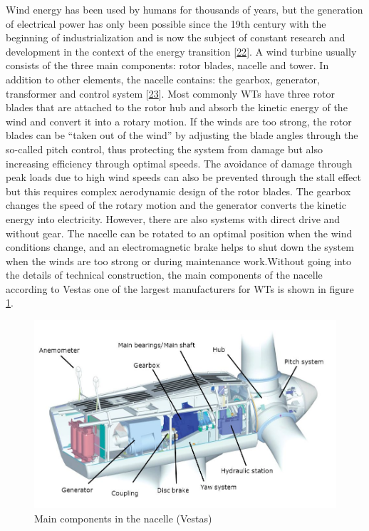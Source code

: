 \documentclass[a4paper,11pt]{article}
\begin{document}
Wind energy has been used by humans for thousands of years, but the generation of electrical power has only been possible since the 19th century with the beginning of industrialization and is now the subject of constant research and development in the context of the energy transition {[}\protect\hyperlink{ref-Wikipedia.2021}{22}{]}. A wind turbine usually consists of the three main components: rotor blades, nacelle and tower. In addition to other elements, the nacelle contains: the gearbox, generator, transformer and control system {[}\protect\hyperlink{ref-MladenBosnjakovic.2013}{23}{]}. Most commonly WTs have three rotor blades that are attached to the rotor hub and absorb the kinetic energy of the wind and convert it into a rotary motion. If the winds are too strong, the rotor blades can be ``taken out of the wind'' by adjusting the blade angles through the so-called pitch control, thus protecting the system from damage but also increasing efficiency through optimal speeds. The avoidance of damage through peak loads due to high wind speeds can also be prevented through the stall effect but this requires complex aerodynamic design of the rotor blades. The gearbox changes the speed of the rotary motion and the generator converts the kinetic energy into electricity. However, there are also systems with direct drive and without gear. The nacelle can be rotated to an optimal position when the wind conditions change, and an electromagnetic brake helps to shut down the system when the winds are too strong or during maintenance work.Without going into the details of technical construction, the main components of the nacelle according to Vestas one of the largest manufacturers for WTs is shown in figure \ref{fig:nacelle}.
\begin{figure}[H]

{\centering \includegraphics[width=1\linewidth]{figures/nacelle} 

}

\caption{Main components in the nacelle (Vestas)}\label{fig:nacelle}
\end{figure}
\end{document}
